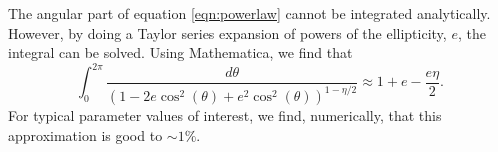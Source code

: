 The angular part of equation \ref{eqn:powerlaw} cannot be integrated analytically. However, by doing a Taylor series expansion of powers of the ellipticity, $e$, the integral can be solved. Using Mathematica, we find that 
\begin{equation}
\int_0^{2 \pi} \frac{d \theta}{ (1 - 2 e \cos^2(\theta) + e^2\cos^2(\theta))^{1 - \eta / 2}} \approx 1 + e  - \frac{ e \eta}{2}.
\end{equation}
For typical parameter values of interest, we find, numerically, that this approximation is good to $\sim1\%$. 